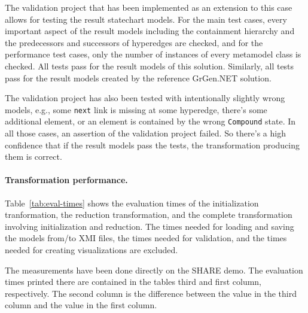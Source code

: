 \documentclass[submission]{eptcs}
\begin{document}
The validation project that has been implemented as an extension to this case
allows for testing the result statechart models.  For the main test cases,
every important aspect of the result models including the containment hierarchy
and the predecessors and successors of hyperedges are checked, and for the
performance test cases, only the number of instances of every metamodel class
is checked.  All tests pass for the result models of this solution.  Similarly,
all tests pass for the result models created by the reference GrGen.NET
solution.

The validation project has also been tested with intentionally slightly wrong
models, e.g., some \verb|next| link is missing at some hyperedge, there's some
additional element, or an element is contained by the wrong \verb|Compound|
state.  In all those cases, an assertion of the validation project failed.  So
there's a high confidence that if the result models pass the tests, the
transformation producing them is correct.

\paragraph{Transformation performance.}


Table~\ref{tab:eval-times} shows the evaluation times of the initialization
tranformation, the reduction transformation, and the complete transformation
involving initialization and reduction.  The times needed for loading and
saving the models from/to XMI files, the times needed for validation, and the
times needed for creating visualizations are excluded.

The measurements have been done directly on the SHARE demo.  The evaluation
times printed there are contained in the tables third and first column,
respectively.  The second column is the difference between the value in the
third column and the value in the first column.
\end{document}

